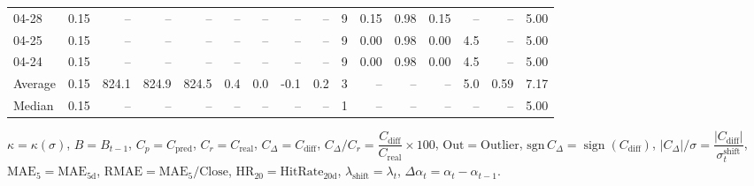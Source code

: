 \begin{threeparttable}
{\begin{tabular}{lrrrrrrrrrrrrrrr}
  04-28 &     0.15 &    -- &    -- &    -- &         -- &             -- &                       -- &                  -- &              9 &       0.15 &      0.98 &           0.15 &               -- &              -- &                   5.00 \\
  04-25 &     0.15 &    -- &    -- &    -- &         -- &             -- &                       -- &                  -- &              9 &       0.00 &      0.98 &           0.00 &              4.5 &              -- &                   5.00 \\
  04-24 &     0.15 &    -- &    -- &    -- &         -- &             -- &                       -- &                  -- &              9 &       0.00 &      0.98 &           0.00 &              4.5 &              -- &                   5.00 \\
Average &     0.15 & 824.1 & 824.9 & 824.5 &        0.4 &            0.0 &                     -0.1 &                 0.2 &              3 &         -- &        -- &             -- &              5.0 &            0.59 &                   7.17 \\
 Median &     0.15 &    -- &    -- &    -- &         -- &             -- &                       -- &                  -- &              1 &         -- &        -- &             -- &               -- &              -- &                   5.00 \\
\bottomrule
\end{tabular}
}
\begin{tablenotes}\footnotesize
\item $\kappa=\kappa(\sigma)$, $B=B_{t-1}$, $C_p=C_{\text{pred}}$, $C_r=C_{\text{real}}$, $C_\Delta=C_{\text{diff}}$, $C_\Delta/C_r=\dfrac{C_{\text{diff}}}{C_{\text{real}}}\times100$, $\mathrm{Out}=\text{Outlier}$, $\mathrm{sgn}\,C_\Delta=\operatorname{sign}(C_{\text{diff}})$, $|C_\Delta|/\sigma=\dfrac{|C_{\text{diff}}|}{\sigma_t^{\text{shift}}}$, $\mathrm{MAE}_5=\mathrm{MAE}_{5\text{d}}$, $\mathrm{RMAE}= \mathrm{MAE}_5 / \text{Close}$, $\mathrm{HR}_{20}=\mathrm{HitRate}_{20\text{d}}$, 
$\lambda_{\text{shift}}=\lambda_t$, 
$\Delta\alpha_t=\alpha_t-\alpha_{t-1}$.
\end{tablenotes}
\end{threeparttable}
\endgroup

